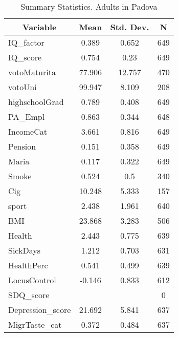 
\begin{table}[htbp]\centering \caption{Summary Statistics. Adults in Padova \label{cityAdultPadova}}
\begin{tabular}{l c c  c}\hline\hline
\multicolumn{1}{c}{\textbf{Variable}} & \textbf{Mean}
 & \textbf{Std. Dev.} & \textbf{N}\\ \hline
IQ\_factor & 0.389 & 0.652  & 649\\
IQ\_score & 0.754 & 0.23  & 649\\
votoMaturita & 77.906 & 12.757  & 470\\
votoUni & 99.947 & 8.109  & 208\\
highschoolGrad & 0.789 & 0.408  & 649\\
PA\_Empl & 0.863 & 0.344  & 648\\
IncomeCat & 3.661 & 0.816  & 649\\
Pension & 0.151 & 0.358  & 649\\
Maria & 0.117 & 0.322  & 649\\
Smoke & 0.524 & 0.5  & 340\\
Cig & 10.248 & 5.333  & 157\\
sport & 2.438 & 1.961  & 640\\
BMI & 23.868 & 3.283  & 506\\
Health & 2.443 & 0.775  & 639\\
SickDays & 1.212 & 0.703  & 631\\
HealthPerc & 0.541 & 0.499  & 639\\
LocusControl & -0.146 & 0.833  & 612\\
SDQ\_score &  &   & 0\\
Depression\_score & 21.692 & 5.841  & 637\\
MigrTaste\_cat & 0.372 & 0.484  & 637\\
\hline\end{tabular}
\end{table}
